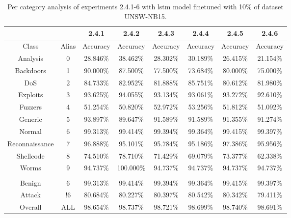 \begin{table}[htb]
    \centering
    \begin{tabular}{@{}cccccccc@{}}
        \toprule
         &  & 2.4.1 & 2.4.2 & 2.4.3 & 2.4.4 & 2.4.5 & 2.4.6 \\
        \midrule
        Class &  Alias &  Accuracy &  Accuracy &  Accuracy &  Accuracy &  Accuracy &  Accuracy \\
        Analysis &  0 &  28.846\% &  38.462\% &  28.302\% &  30.189\% &  26.415\% &  21.154\% \\
        Backdoors &  1 &  90.000\% &  87.500\% &  77.500\% &  73.684\% &  80.000\% &  75.000\% \\
        DoS &  2 &  84.733\% &  82.952\% &  81.888\% &  85.751\% &  80.612\% &  81.980\% \\
        Exploits &  3 &  93.625\% &  94.055\% &  93.134\% &  93.061\% &  93.272\% &  92.610\% \\
        Fuzzers &  4 &  51.254\% &  50.820\% &  52.972\% &  53.256\% &  51.812\% &  51.092\% \\
        Generic &  5 &  93.897\% &  89.647\% &  91.589\% &  91.589\% &  91.355\% &  91.274\% \\
        Normal &  6 &  99.313\% &  99.414\% &  99.394\% &  99.364\% &  99.415\% &  99.397\% \\
        Reconnaissance &  7 &  96.888\% &  95.101\% &  95.784\% &  95.186\% &  97.386\% &  95.956\% \\
        Shellcode &  8 &  74.510\% &  78.710\% &  71.429\% &  69.079\% &  73.377\% &  62.338\% \\
        Worms &  9 &  94.737\% &  100.000\% &  94.737\% &  94.737\% &  94.737\% &  94.737\% \\
         \\
        Benign &  6 &  99.313\% &  99.414\% &  99.394\% &  99.364\% &  99.415\% &  99.397\% \\
        Attack &  !6 &  80.684\% &  80.227\% &  80.397\% &  80.542\% &  80.342\% &  79.411\% \\
        Overall &  ALL &  98.654\% &  98.737\% &  98.721\% &  98.699\% &  98.740\% &  98.691\% \\
        \bottomrule
    \end{tabular}
    \caption{Per category analysis of experiments 2.4.1-6 with \gls{lstm} model finetuned with 10\% of dataset UNSW-NB15.}
    \label{table:results:lstm:class_flows15_10}
\end{table}